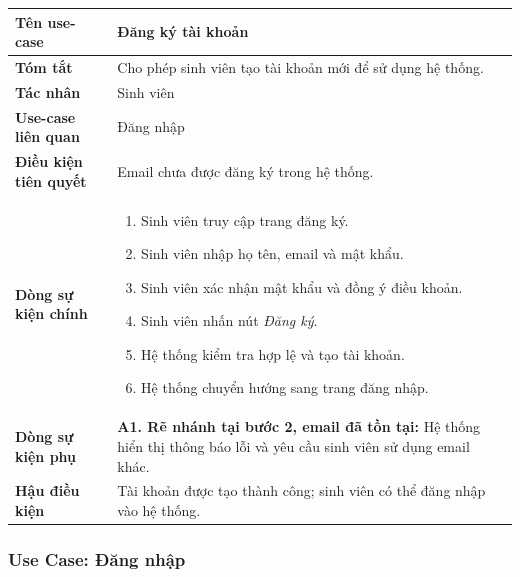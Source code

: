\begin{longtable}{|>{\raggedright\arraybackslash}p{4.2cm}|>{\raggedright\arraybackslash}p{9.8cm}|}
	\hline
	\textbf{Tên use-case} & Đăng ký tài khoản \\ \hline
	\textbf{Tóm tắt} & Cho phép sinh viên tạo tài khoản mới để sử dụng hệ thống. \\ \hline
	\textbf{Tác nhân} & Sinh viên \\ \hline
	\textbf{Use-case liên quan} & Đăng nhập \\ \hline
	\textbf{Điều kiện tiên quyết} & Email chưa được đăng ký trong hệ thống. \\ \hline
	\textbf{Dòng sự kiện chính} &
	\begin{enumerate}
		\item Sinh viên truy cập trang đăng ký.
		\item Sinh viên nhập họ tên, email và mật khẩu.
		\item Sinh viên xác nhận mật khẩu và đồng ý điều khoản.
		\item Sinh viên nhấn nút \textit{Đăng ký}.
		\item Hệ thống kiểm tra hợp lệ và tạo tài khoản.
		\item Hệ thống chuyển hướng sang trang đăng nhập.
	\end{enumerate} \\ \hline
	\textbf{Dòng sự kiện phụ} & \textbf{A1. Rẽ nhánh tại bước 2, email đã tồn tại:} Hệ thống hiển thị thông báo lỗi và yêu cầu sinh viên sử dụng email khác. \\ \hline
	\textbf{Hậu điều kiện} & Tài khoản được tạo thành công; sinh viên có thể đăng nhập vào hệ thống. \\ \hline
\end{longtable}

\subsubsection{Use Case: Đăng nhập}
\label{sec:uc-dang-nhap}

